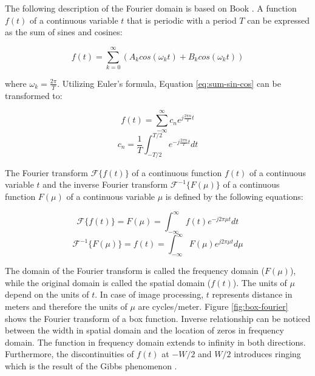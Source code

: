 The following description of the Fourier domain is based on Book \cite{gonzalez2018digital}.  A function $f(t)$ of a continuous variable $t$ that is periodic with a period $T$ can be expressed as the sum of sines and cosines:

\begin{equation}
	f(t)=\sum_{k=0}^{\infty}(A_{k}cos(\omega_{k}t)+B_{k}cos(\omega_{k}t))
	\label{eq:sum-sin-cos}
\end{equation}

where $\omega_k=\frac{2\pi}{T}$. Utilizing Euler's formula, Equation \ref{eq:sum-sin-cos} can be transformed to:

\begin{equation}
	f(t)=\sum_{-\infty}^{\infty}c_{n}e^{j\frac{2\pi n}{T}t}
	\label{eq:sum-sin-cos-euler}
\end{equation}
\begin{equation}
	c_{n}=\frac{1}{T}\int_{-T/2}^{T/2}e^{-j\frac{2\pi n}{T}t}dt
	\label{eq:sum-sin-cos-euler-normalization}
\end{equation}

The Fourier transform $\mathcal{F}\{f(t)\}$ of a continuous function $f(t)$ of a continuous variable $t$ and the inverse Fourier transform $\mathcal{F}^{-1}\{F(\mu)\}$ of a continuous function $F(\mu)$ of a continuous variable $\mu$  is defined by the following equations:

\begin{equation}
	\mathcal{F}\{f(t)\}=F(\mu)=\int_{-\infty}^{\infty}f(t)e^{-j2\pi \mu t}dt
	\label{eq:fourier-transform}
\end{equation}
\begin{equation}
	\mathcal{F}^{-1}\{F(\mu)\}=f(t)=\int_{-\infty}^{\infty}F(\mu)e^{j2\pi \mu t}d\mu
	\label{eq:inverse-fourier-transform}
\end{equation}

The domain of the Fourier transform is called the frequency domain ($F(\mu)$), while the original domain is called the spatial domain ($f(t)$). The units of $\mu$ depend on the units of $t$. In case of image processing, $t$ represents distance in meters and therefore the units of $\mu$ are cycles/meter. Figure \ref{fig:box-fourier} shows the Fourier transform of a box function. Inverse relationship can be noticed between the width in spatial domain and the location of zeros in frequency domain. The function in frequency domain extends to infinity in both directions. Furthermore, the discontinuities of $f(t)$ at $-W/2$ and $W/2$ introduces ringing which is the result of the Gibbs phenomenon \cite{gottlieb1997gibbs}.

